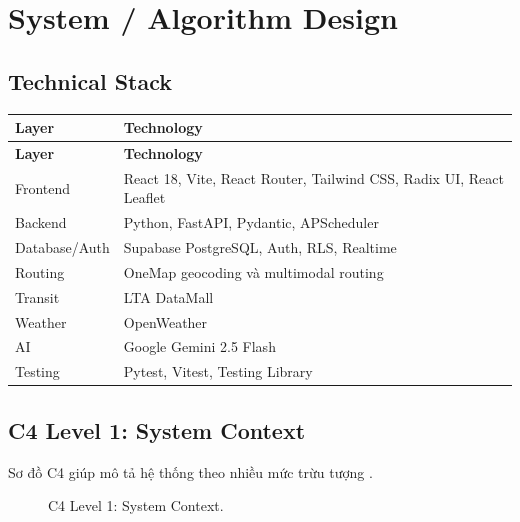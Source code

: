 \chapter{System / Algorithm Design}

\section{Technical Stack}

\begin{longtable}{p{3.6cm}p{10.5cm}}
\toprule
\textbf{Layer} & \textbf{Technology} \\
\midrule
\endfirsthead
\toprule
\textbf{Layer} & \textbf{Technology} \\
\midrule
\endhead
Frontend & React 18, Vite, React Router, Tailwind CSS, Radix UI, React Leaflet \cite{react,vite} \\
Backend & Python, FastAPI, Pydantic, APScheduler \cite{fastapi} \\
Database/Auth & Supabase PostgreSQL, Auth, RLS, Realtime \cite{supabase} \\
Routing & OneMap geocoding và multimodal routing \cite{onemap} \\
Transit & LTA DataMall \cite{lta} \\
Weather & OpenWeather \cite{openweather} \\
AI & Google Gemini 2.5 Flash \cite{gemini} \\
Testing & Pytest, Vitest, Testing Library \\
\bottomrule
\end{longtable}

\section{C4 Level 1: System Context}

Sơ đồ C4 giúp mô tả hệ thống theo nhiều mức trừu tượng \cite{c4model}.

\begin{figure}[H]
\centering
{}
\caption{C4 Level 1: System Context.}
\label{fig:c4-context}
\end{figure}

